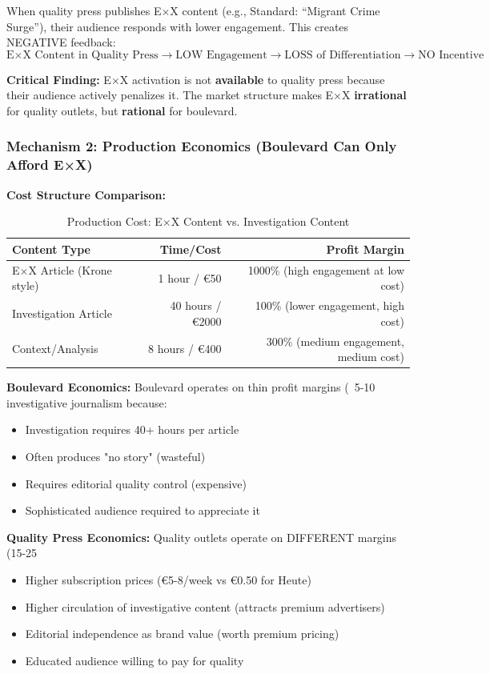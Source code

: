 When quality press publishes E×X content (e.g., Standard: ``Migrant Crime Surge''), their audience
responds with lower engagement. This creates NEGATIVE feedback:
\[
\text{E×X Content in Quality Press} \rightarrow \text{LOW Engagement} \rightarrow \text{LOSS of Differentiation} \rightarrow \text{NO Incentive}
\]

\textbf{Critical Finding:} E×X activation is not \textbf{available} to quality press because their
audience actively penalizes it. The market structure makes E×X \textbf{irrational} for quality outlets,
but \textbf{rational} for boulevard.

\subsubsection*{Mechanism 2: Production Economics (Boulevard Can Only Afford E×X)}

\textbf{Cost Structure Comparison:}

\begin{table}[h]
\centering
\caption{Production Cost: E×X Content vs. Investigation Content}
\label{tab:dx-production-costs}
\begin{tabular}{|l|r|r|}
\hline
\textbf{Content Type} & \textbf{Time/Cost} & \textbf{Profit Margin} \\
\hline
E×X Article (Krone style) & 1 hour / €50 & 1000\% (high engagement at low cost) \\
Investigation Article & 40 hours / €2000 & 100\% (lower engagement, high cost) \\
Context/Analysis & 8 hours / €400 & 300\% (medium engagement, medium cost) \\
\hline
\end{tabular}
\end{table}

\textbf{Boulevard Economics:}
Boulevard operates on thin profit margins (~5-10%
investigative journalism because:
\begin{itemize}
\item Investigation requires 40+ hours per article
\item Often produces "no story" (wasteful)
\item Requires editorial quality control (expensive)
\item Sophisticated audience required to appreciate it
\end{itemize}

\textbf{Quality Press Economics:}
Quality outlets operate on DIFFERENT margins (15-25%
\begin{itemize}
\item Higher subscription prices (€5-8/week vs €0.50 for Heute)
\item Higher circulation of investigative content (attracts premium advertisers)
\item Editorial independence as brand value (worth premium pricing)
\item Educated audience willing to pay for quality
\end{itemize}

